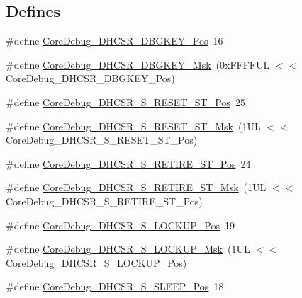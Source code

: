 \subsection*{\-Defines}
\begin{DoxyCompactItemize}
\item 
\#define \hyperlink{group___c_m_s_i_s___core_debug_gac91280edd0ce932665cf75a23d11d842}{\-Core\-Debug\-\_\-\-D\-H\-C\-S\-R\-\_\-\-D\-B\-G\-K\-E\-Y\-\_\-\-Pos}~16
\item 
\#define \hyperlink{group___c_m_s_i_s___core_debug_ga1ce997cee15edaafe4aed77751816ffc}{\-Core\-Debug\-\_\-\-D\-H\-C\-S\-R\-\_\-\-D\-B\-G\-K\-E\-Y\-\_\-\-Msk}~(0x\-F\-F\-F\-F\-U\-L $<$$<$ Core\-Debug\-\_\-\-D\-H\-C\-S\-R\-\_\-\-D\-B\-G\-K\-E\-Y\-\_\-\-Pos)
\item 
\#define \hyperlink{group___c_m_s_i_s___core_debug_ga6f934c5427ea057394268e541fa97753}{\-Core\-Debug\-\_\-\-D\-H\-C\-S\-R\-\_\-\-S\-\_\-\-R\-E\-S\-E\-T\-\_\-\-S\-T\-\_\-\-Pos}~25
\item 
\#define \hyperlink{group___c_m_s_i_s___core_debug_gac474394bcceb31a8e09566c90b3f8922}{\-Core\-Debug\-\_\-\-D\-H\-C\-S\-R\-\_\-\-S\-\_\-\-R\-E\-S\-E\-T\-\_\-\-S\-T\-\_\-\-Msk}~(1\-U\-L $<$$<$ Core\-Debug\-\_\-\-D\-H\-C\-S\-R\-\_\-\-S\-\_\-\-R\-E\-S\-E\-T\-\_\-\-S\-T\-\_\-\-Pos)
\item 
\#define \hyperlink{group___c_m_s_i_s___core_debug_ga2328118f8b3574c871a53605eb17e730}{\-Core\-Debug\-\_\-\-D\-H\-C\-S\-R\-\_\-\-S\-\_\-\-R\-E\-T\-I\-R\-E\-\_\-\-S\-T\-\_\-\-Pos}~24
\item 
\#define \hyperlink{group___c_m_s_i_s___core_debug_ga89dceb5325f6bcb36a0473d65fbfcfa6}{\-Core\-Debug\-\_\-\-D\-H\-C\-S\-R\-\_\-\-S\-\_\-\-R\-E\-T\-I\-R\-E\-\_\-\-S\-T\-\_\-\-Msk}~(1\-U\-L $<$$<$ Core\-Debug\-\_\-\-D\-H\-C\-S\-R\-\_\-\-S\-\_\-\-R\-E\-T\-I\-R\-E\-\_\-\-S\-T\-\_\-\-Pos)
\item 
\#define \hyperlink{group___c_m_s_i_s___core_debug_ga2900dd56a988a4ed27ad664d5642807e}{\-Core\-Debug\-\_\-\-D\-H\-C\-S\-R\-\_\-\-S\-\_\-\-L\-O\-C\-K\-U\-P\-\_\-\-Pos}~19
\item 
\#define \hyperlink{group___c_m_s_i_s___core_debug_ga7b67e4506d7f464ef5dafd6219739756}{\-Core\-Debug\-\_\-\-D\-H\-C\-S\-R\-\_\-\-S\-\_\-\-L\-O\-C\-K\-U\-P\-\_\-\-Msk}~(1\-U\-L $<$$<$ Core\-Debug\-\_\-\-D\-H\-C\-S\-R\-\_\-\-S\-\_\-\-L\-O\-C\-K\-U\-P\-\_\-\-Pos)
\item 
\#define \hyperlink{group___c_m_s_i_s___core_debug_ga349ccea33accc705595624c2d334fbcb}{\-Core\-Debug\-\_\-\-D\-H\-C\-S\-R\-\_\-\-S\-\_\-\-S\-L\-E\-E\-P\-\_\-\-Pos}~18

\end{DoxyCompactItemize}
